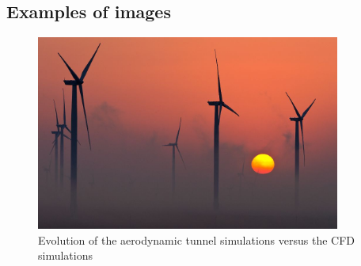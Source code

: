 \documentclass[12pt]{article}
\renewcommand{\thefigure}{\arabic{section}.\arabic{figure}}
\begin{document}



 
 
 
 
 
 

\newpage
\subsection{Examples of images}

\begin{figure}[!ht]
\renewcommand\thefigure{I.1} %
\centering
\includegraphics[width=10cm]{1-WindF-2}
\caption{Evolution of the aerodynamic tunnel simulations versus the CFD simulations}\label{figI1}
\end{figure}
\end{document}
